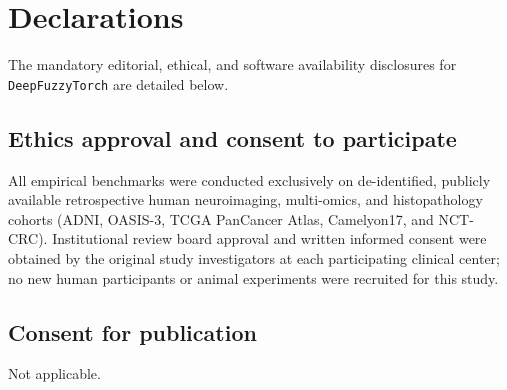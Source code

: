 \documentclass[10pt,twocolumn]{article}
\begin{document}
\section{Declarations}
\label{sec:declarations}
The mandatory editorial, ethical, and software availability disclosures for
\texttt{DeepFuzzyTorch} are detailed below.

\subsection*{Ethics approval and consent to participate}
All empirical benchmarks were conducted exclusively on de-identified, publicly available
retrospective human neuroimaging, multi-omics, and histopathology cohorts (ADNI, OASIS-3, TCGA
PanCancer Atlas, Camelyon17, and NCT-CRC). Institutional review board approval and written
informed consent were obtained by the original study investigators at each participating
clinical center; no new human participants or animal experiments were recruited for this study.

\subsection*{Consent for publication}
Not applicable.
\end{document}
